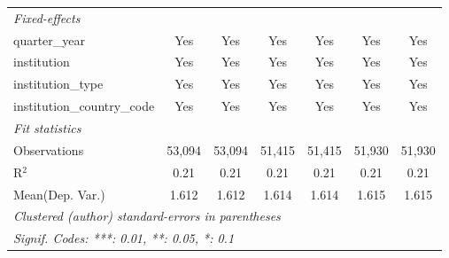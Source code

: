 \begin{tabular}{lcccccc}
   \midrule
   \emph{Fixed-effects}\\
   quarter\_year                      & Yes     & Yes          & Yes     & Yes     & Yes     & Yes\\  
   institution                        & Yes     & Yes          & Yes     & Yes     & Yes     & Yes\\  
   institution\_type                  & Yes     & Yes          & Yes     & Yes     & Yes     & Yes\\  
   institution\_country\_code         & Yes     & Yes          & Yes     & Yes     & Yes     & Yes\\  
   \midrule
   \emph{Fit statistics}\\
   Observations                       & 53,094  & 53,094       & 51,415  & 51,415  & 51,930  & 51,930\\  
   R$^2$                              & 0.21    & 0.21         & 0.21    & 0.21    & 0.21    & 0.21\\  
Mean(Dep. Var.) & 1.612 & 1.612 & 1.614 & 1.614 & 1.615 & 1.615 \\
   \midrule \midrule
   \multicolumn{7}{l}{\emph{Clustered (author) standard-errors in parentheses}}\\
   \multicolumn{7}{l}{\emph{Signif. Codes: ***: 0.01, **: 0.05, *: 0.1}}\\
\end{tabular}
\par\endgroup
